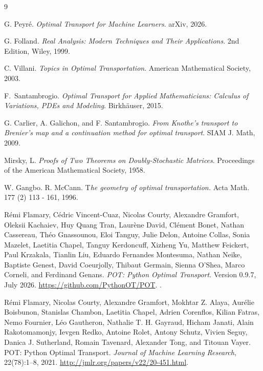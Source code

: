 \documentclass[12pt]{article}
\theoremstyle{definition}
\theoremstyle{plain}
\begin{document}
\begin{thebibliography}{9}

G. Peyré.
\textit{Optimal Transport for Machine Learners}.
arXiv, 2026.

G. Folland.
\textit{Real Analysis: Modern Techniques and Their Applications}.
2nd Edition, Wiley, 1999.

C. Villani.
\textit{Topics in Optimal
Transportation}.
American Mathematical Society, 2003.

F.~Santambrogio.
\textit{Optimal Transport for Applied Mathematicians: Calculus of Variations, PDEs and Modeling}.
Birkhäuser, 2015.

G. Carlier, A. Galichon, and F. Santambrogio. 
\textit{From Knothe’s transport
to Brenier’s map and a continuation method for optimal transport}.
SIAM J. Math, 2009.

Mirsky, L. 
\textit{Proofs of Two Theorems on Doubly-Stochastic Matrices}. Proceedings of the American Mathematical Society, 1958.

W. Gangbo. R.  McCann. T\textit{he geometry of optimal transportation.} Acta Math. 177 (2) 113 - 161, 1996.

Rémi Flamary, Cédric Vincent-Cuaz, Nicolas Courty, Alexandre Gramfort,
Oleksii Kachaiev, Huy Quang Tran, Laurène David, Clément Bonet,
Nathan Cassereau, Théo Gnassounou, Eloi Tanguy, Julie Delon,
Antoine Collas, Sonia Mazelet, Laetitia Chapel, Tanguy Kerdoncuff,
Xizheng Yu, Matthew Feickert, Paul Krzakala, Tianlin Liu,
Eduardo Fernandes Montesuma, Nathan Neike, Baptiste Genest,
David Coeurjolly, Thibaut Germain, Sienna O'Shea, Marco Corneli,
and Ferdinand Genans.
\newblock \emph{POT: Python Optimal Transport}.
\newblock Version 0.9.7, July 2026.
\newblock \url{https://github.com/PythonOT/POT}.
\newblock {}.

Rémi Flamary, Nicolas Courty, Alexandre Gramfort, Mokhtar Z. Alaya,
Aurélie Boisbunon, Stanislas Chambon, Laetitia Chapel, Adrien Corenflos,
Kilian Fatras, Nemo Fournier, Léo Gautheron, Nathalie T. H. Gayraud,
Hicham Janati, Alain Rakotomamonjy, Ievgen Redko, Antoine Rolet,
Antony Schutz, Vivien Seguy, Danica J. Sutherland, Romain Tavenard,
Alexander Tong, and Titouan Vayer.
\newblock POT: Python Optimal Transport.
\newblock \emph{Journal of Machine Learning Research},
  22(78):1--8, 2021.
\newblock \url{http://jmlr.org/papers/v22/20-451.html}.

\end{thebibliography}

\end{document}
